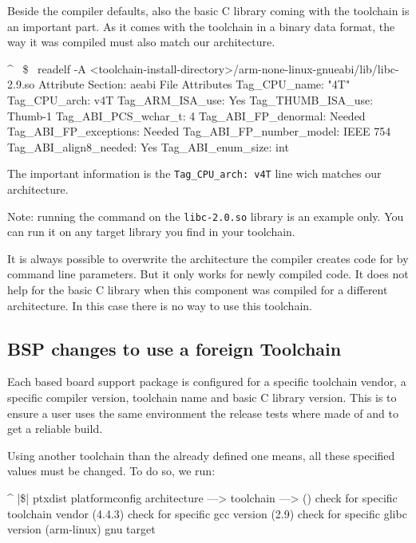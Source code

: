 Beside the compiler defaults, also the basic C library coming with the toolchain
is an important part. As it comes with the toolchain in a binary data format,
the way it was compiled must also match our architecture.

\begin{ptxshell}[escapechar=~]{^}
~\$~ readelf -A <toolchain-install-directory>/arm-none-linux-gnueabi/lib/libc-2.9.so
Attribute Section: aeabi
File Attributes
  Tag_CPU_name: "4T"
  Tag_CPU_arch: v4T
  Tag_ARM_ISA_use: Yes
  Tag_THUMB_ISA_use: Thumb-1
  Tag_ABI_PCS_wchar_t: 4
  Tag_ABI_FP_denormal: Needed
  Tag_ABI_FP_exceptions: Needed
  Tag_ABI_FP_number_model: IEEE 754
  Tag_ABI_align8_needed: Yes
  Tag_ABI_enum_size: int
\end{ptxshell}

The important information is the \texttt{Tag_CPU_arch: v4T} line wich matches
our architecture.

Note: running the command on the \texttt{libc-2.0.so} library is an example
only. You can run it on any target library you find in your toolchain.

\begin{important}
It is always possible to overwrite the architecture the compiler creates code
for by command line parameters. But it only works for newly compiled code. It
does not help for the basic C library when this component was compiled for a
different architecture. In this case there is no way to use this toolchain.
\end{important}

\subsection{BSP changes to use a foreign Toolchain}

Each \ptxdist{} based board support package is configured for a specific
toolchain vendor, a specific compiler version, toolchain name and basic C
library version. This is to ensure a user uses the same environment the release
tests where made of and to get a reliable build.

Using another toolchain than the already defined one means, all these
specified values must be changed. To do so, we run:

\begin{ptxshell}[escapechar=|]{^}
|\$| ptxdist platformconfig
 architecture --->
   toolchain  --->
      ()  check for specific toolchain vendor
      (4.4.3) check for specific gcc version
      (2.9) check for specific glibc version
      (arm-linux) gnu target
\end{ptxshell}

